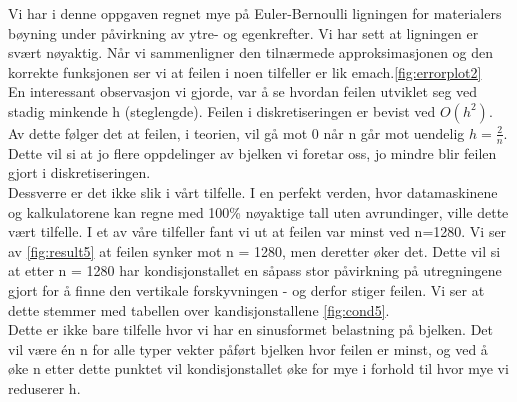 Vi har i denne oppgaven regnet mye på Euler-Bernoulli ligningen for materialers bøyning under påvirkning av ytre- og egenkrefter. Vi har sett at ligningen er svært nøyaktig. Når vi sammenligner den tilnærmede approksimasjonen og den korrekte funksjonen ser vi at feilen i noen tilfeller er lik emach.\ref{fig:errorplot2}\\

En interessant observasjon vi gjorde, var å se hvordan feilen utviklet seg ved stadig minkende h (steglengde). Feilen i diskretiseringen er bevist ved $O(h^2)$. Av dette følger det at feilen, i teorien, vil gå mot 0 når n går mot uendelig $h=\frac{2}{n}$. Dette vil si at jo flere oppdelinger av bjelken vi foretar oss, jo mindre blir feilen gjort i diskretiseringen.\\

Dessverre er det ikke slik i vårt tilfelle. I en perfekt verden, hvor datamaskinene og kalkulatorene kan regne med 100\% nøyaktige tall uten avrundinger, ville dette vært tilfelle. I et av våre tilfeller fant vi ut at feilen var minst ved n=1280. Vi ser av \ref{fig:result5} at feilen synker mot n = 1280, men deretter øker det. Dette vil si at etter n = 1280 har kondisjonstallet en såpass stor påvirkning på utregningene gjort for å finne den vertikale forskyvningen - og derfor stiger feilen. Vi ser at dette stemmer med tabellen over kandisjonstallene \ref{fig:cond5}.\\

Dette er ikke bare tilfelle hvor vi har en sinusformet belastning på bjelken. Det vil være én n for alle typer vekter påført bjelken hvor feilen er minst, og ved å øke n etter dette punktet vil kondisjonstallet øke for mye i forhold til hvor mye vi reduserer h. 

